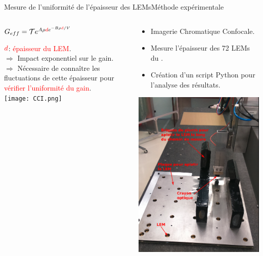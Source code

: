      \begin{frame}{Mesure de l'uniformité de l'épaisseur des LEMs}{Méthode expérimentale}
    	\begin{scriptsize}
    		\begin{columns}
    			\begin{column}{0.5\textwidth}
    				\begin{center}
    					$G _{eff}= \mathcal{T}e^{A\rho \textcolor{red}{d} e^{-B\rho \textcolor{red}{d}/V}}$\\
    				\end{center}
    				$\textcolor{red}{d}$: \textcolor{red}{épaisseur du LEM}.\\
    				$\Rightarrow$ Impact exponentiel sur le gain.\\
    				$\Rightarrow$ Nécessaire de connaître les fluctuations de cette épaisseur pour \textcolor{red}{vérifier l'uniformité du gain}.\\
    				\vfill
    				\centering \texttt{[image: CCI.png]}\\\vfill
    			\end{column}
    			\hfill
    			\begin{column}{0.5\textwidth}
    				\begin{itemize}
    					\item Imagerie Chromatique Confocale.
    					\item Mesure l'épaisseur des 72 LEMs du \SSS{}.
    					\item Création d'un script Python pour l'analyse des résultats.
    				\end{itemize}
    				\centering \includegraphics[height=0.6\textheight]{./pictures/plate_and_bricks.png}\\

\end{column}
\end{columns}
\end{scriptsize}
\end{frame}
